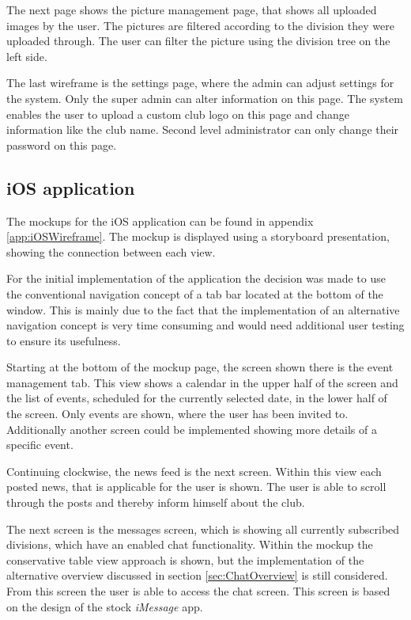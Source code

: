 The next page shows the picture management page, that shows all uploaded images by the user. The pictures are filtered according to the division they were uploaded through. The user can filter the picture using the division tree on the left side.

The last wireframe is the settings page, where the admin can adjust settings for the system. Only the super admin can alter information on this page. The system enables the user to upload a custom club logo on this page and change information like the club name. Second level administrator can only change their password on this page. 

\subsection{iOS application}
The mockups for the iOS application can be found in appendix \vref{app:iOSWireframe}. The mockup is displayed using a storyboard presentation, showing the connection between each view.

For the initial implementation of the application the decision was made to use the conventional navigation concept of a tab bar located at the bottom of the window. This is mainly due to the fact that the implementation of an alternative navigation concept is very time consuming and would need additional user testing to ensure its usefulness.

Starting at the bottom of the mockup page, the screen shown there is the event management tab. This view shows a calendar in the upper half of the screen and the list of events, scheduled for the currently selected date, in the lower half of the screen. Only events are shown, where the user has been invited to. Additionally another screen could be implemented showing more details of a specific event.

Continuing clockwise, the news feed is the next screen. Within this view each posted news, that is applicable for the user is shown. The user is able to scroll through the posts and thereby inform himself about the club.

The next screen is the messages screen, which is showing all currently subscribed divisions, which have an enabled chat functionality. Within the mockup the conservative table view approach is shown, but the implementation of the alternative overview discussed in section \vref{sec:ChatOverview} is still considered. From this screen the user is able to access the chat screen. This screen is based on the design of the stock \emph{iMessage} app.

